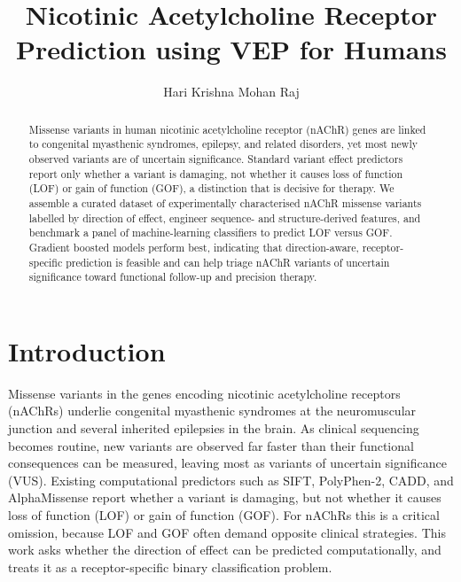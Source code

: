 \documentclass{ws-procs11x85}
\begin{document}
\title{Nicotinic Acetylcholine Receptor Prediction using VEP for Humans}

\author{Hari Krishna Mohan Raj}

\address{Department of Computational Chemistry,\\
Hochschule Bonn Rhein Sieg, Sankt Augustin, Germany\\
E-mail: harikrishnam0711@gmail.com}

\begin{abstract}
Missense variants in human nicotinic acetylcholine receptor (nAChR)
genes are linked to congenital myasthenic syndromes, epilepsy, and
related disorders, yet most newly observed variants are of uncertain
significance. Standard variant effect predictors report only whether a
variant is damaging, not whether it causes loss of function (LOF) or
gain of function (GOF), a distinction that is decisive for therapy. We
assemble a curated dataset of experimentally characterised nAChR
missense variants labelled by direction of effect, engineer sequence-
and structure-derived features, and benchmark a panel of machine-learning
classifiers to predict LOF versus GOF. Gradient boosted models perform
best, indicating that direction-aware, receptor-specific prediction is
feasible and can help triage nAChR variants of uncertain significance
toward functional follow-up and precision therapy.
\end{abstract}



\section{Introduction}\label{sec:intro}
Missense variants in the genes encoding nicotinic acetylcholine
receptors (nAChRs) underlie congenital myasthenic syndromes at the
neuromuscular junction and several inherited epilepsies in the brain.
As clinical sequencing becomes routine, new variants are observed far
faster than their functional consequences can be measured, leaving most
as variants of uncertain significance (VUS). Existing computational
predictors such as SIFT, PolyPhen-2,
CADD, and AlphaMissense report whether a
variant is damaging, but not whether it causes loss of function (LOF) or
gain of function (GOF). For nAChRs this is a critical omission, because
LOF and GOF often demand opposite clinical strategies. This work asks
whether the direction of effect can be predicted computationally, and
treats it as a receptor-specific binary classification problem.
\end{document}
